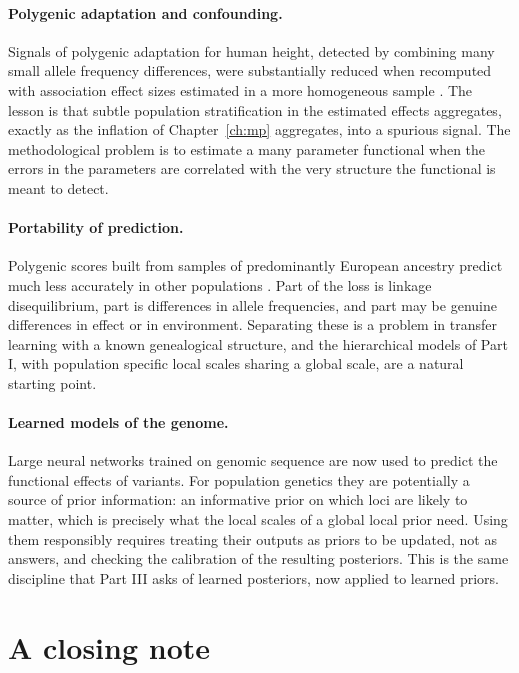 \paragraph{Polygenic adaptation and confounding.} Signals of polygenic adaptation for human height,
detected by combining many small allele frequency differences, were substantially reduced when
recomputed with association effect sizes estimated in a more homogeneous sample
\citep{future:berg2019,future:sohail2019}. The lesson is that subtle population stratification in
the estimated effects aggregates, exactly as the inflation of Chapter~\ref{ch:mp} aggregates, into
a spurious signal. The methodological problem is to estimate a many parameter functional when the
errors in the parameters are correlated with the very structure the functional is meant to detect.

\paragraph{Portability of prediction.} Polygenic scores built from samples of predominantly
European ancestry predict much less accurately in other populations \citep{future:martin2019}. Part
of the loss is linkage disequilibrium, part is differences in allele frequencies, and part may be
genuine differences in effect or in environment. Separating these is a problem in transfer learning
with a known genealogical structure, and the hierarchical models of Part I, with population
specific local scales sharing a global scale, are a natural starting point.

\paragraph{Learned models of the genome.} Large neural networks trained on genomic sequence are now
used to predict the functional effects of variants. For population genetics they are potentially a
source of prior information: an informative prior on which loci are likely to matter, which is
precisely what the local scales of a global local prior need. Using them responsibly requires
treating their outputs as priors to be updated, not as answers, and checking the calibration of the
resulting posteriors. This is the same discipline that Part III asks of learned posteriors, now
applied to learned priors.

\section{A closing note}

